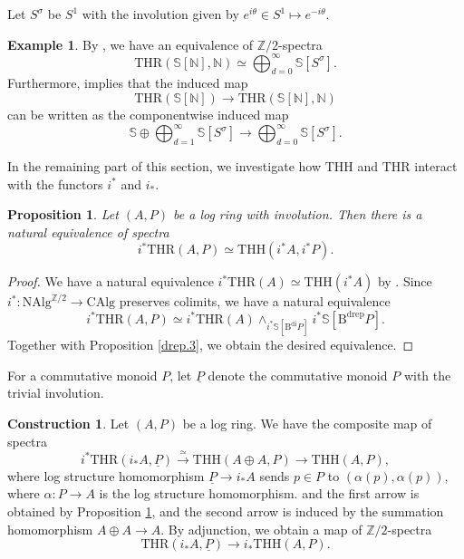 \documentclass[10pt]{amsart}
\newtheorem{prop}[thm]{Proposition}
\theoremstyle{definition}
\newtheorem{exm}[thm]{Example}
\newtheorem{const}[thm]{Construction}
\theoremstyle{remark}
\numberwithin{equation}{section}
\newcommand{\N}{\mathbb{N}}
\newcommand{\Sphere}{\mathbb{S}}
\newcommand{\Z}{\mathbb{Z}}
\newcommand{\ul}{\underline}
\newcommand{\CAlg}{\mathrm{CAlg}}
\newcommand{\NAlg}{\mathrm{NAlg}}
\newcommand{\Bdi}{\mathrm{B}^{\mathrm{di}}}
\newcommand{\Bdrep}{\mathrm{B}^\mathrm{drep}}
\newcommand{\THH}{\mathrm{THH}}
\newcommand{\THR}{\mathrm{THR}}
\newcommand{\Ztwo}{{\mathbb{Z}/2}}
\begin{document}
Let $S^\sigma$ be $S^1$ with the involution given by $e^{i\theta}\in S^1 \mapsto e^{-i\theta}$.

\begin{exm}
\label{thrlog.10}
By \cite[(4.12)]{THR},
we have an equivalence of $\Ztwo$-spectra
\[
\THR(\Sphere[\N],\N)
\simeq
\bigoplus_{d=0}^\infty \Sphere[S^\sigma].
\]
Furthermore,
\cite[Propositions 4.2.11, 4.2.12]{THR} implies that the induced map
\[
\THR(\Sphere[\N])
\to
\THR(\Sphere[\N],\N)
\]
can be written as the componentwise induced map
\[
\Sphere\oplus \bigoplus_{d=1}^\infty \Sphere[S^\sigma]
\to
\bigoplus_{d=0}^\infty \Sphere[S^\sigma].
\]
\end{exm}


In the remaining part of this section,
we investigate how $\THH$ and $\THR$ interact with the functors $i^*$ and $i_*$.

\begin{prop}
\label{thrlog.1}
Let $(A,P)$ be a log ring with involution.
Then there is a natural equivalence of spectra
\[
i^*\THR(A,P)
\simeq
\THH(i^*A,i^*P).
\]
\end{prop}
\begin{proof}
We have a natural equivalence $i^*\THR(A)\simeq \THH(i^*A)$
by \cite[Proposition 3.4.7]{THR}.
Since $i^*\colon \NAlg^{\Ztwo}\to \CAlg$ preserves colimits,
we have a natural equivalence
\[
i^*\THR(A,P)
\simeq
i^*\THR(A)\wedge_{i^*\Sphere[\Bdi P]}i^*\Sphere[\Bdrep P].
\]
Together with Proposition \ref{drep.3},
we obtain the desired equivalence.
\end{proof}





For a commutative monoid $P$,
let $\ul{P}$ denote the commutative monoid $P$ with the trivial involution.

\begin{const}
\label{thrlog.11}
Let $(A,P)$ be a log ring.
We have the composite map of spectra
\[
i^*\THR(i_*A,\ul{P})
\xrightarrow{\simeq}
\THH(A\oplus A,P)
\to
\THH(A,P),
\]
where log structure homomorphism $\ul{P}\to i_*A$ sends $p\in P$ to
$(\alpha(p),\alpha(p))$,
where $\alpha\colon P\to A$ is the log structure homomorphism.
and the first arrow is obtained by Proposition \ref{thrlog.1}, and the second arrow is induced by the summation homomorphism $A\oplus A\to A$.
By adjunction,
we obtain a map of $\Z/2$-spectra
\begin{equation}
\label{thrlog.11.1}
\THR(i_*A,\ul{P})
\to
i_*\THH(A,P).
\end{equation}
\end{const}
\end{document}
